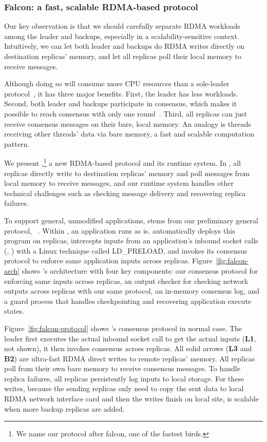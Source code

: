 \vspace{-.15in}\subsubsection{Falcon: a fast, scalable RDMA-based \paxos 
protocol} 
\label{sec:falcon}\vspace{-.075in}

Our key observation is that we should carefully separate RDMA workloads among
the leader and backups, especially in a scalability-sensitive context. 
Intuitively, we can let both leader and backups do RDMA writes directly on 
destination replicas' memory, and let all replicas poll their local memory to 
receive messages.

Although doing so will consume more CPU resources than a sole-leader 
protocol~\cite{dare:hpdc15}, it has three major benefits. First, the leader 
has less workloads. Second, both leader and backups participate in consensus, 
which makes it possible to reach consensus with only one 
round~\cite{paxos:practical}. Third, all replicas can just receive consensus 
messages on their bare, local memory. An analogy is threads receiving other 
threads' data via bare memory, a fast and scalable computation pattern.

We present \falcon,\footnote{We name our protocol after
falcon, one of the fastest birds.} a new RDMA-based \paxos protocol and its
runtime system. In \xxx, all replicas directly write to destination
replicas' memory and poll messages from local memory to receive messages, and 
our runtime system handles other technical challenges such as checking message 
delivery and recovering replica failures.

To support general, unmodified applications, \falcon stems from our preliminary 
general protocol, \crane~\cite{crane:sosp15}. Within \falcon, an application 
runs as is. \falcon automatically deploys this program on replicas, intercepts 
inputs from an application's inbound socket calls (\eg, \recv) with a Linux 
technique called LD\_PRELOAD, and invokes its consensus protocol to enforce same 
application inputs across replicas. Figure~\ref{fig:falcon-arch} shows 
\falcon's architecture with four key components: our consensus protocol for 
enforcing same inputs across replicas, an output checker for checking network 
outputs across replicas with our same protocol, an in-memory consensus 
log, and a guard process that handles checkpointing and recovering application 
execute states.

Figure~\ref{fig:falcon-protocol} shows \falcon's consensus protocol in normal 
case. The leader first executes the actual inbound socket call to get the 
actual inputs (\textbf{L1}, not shown), it then invokes consensus across 
replicas. All solid arrows (\textbf{L3} and \textbf{B2}) are ultra-fast RDMA 
direct writes to remote replicas' memory. All replicas poll from their own bare 
memory to receive consensus messages. To handle replica failures, all replicas 
persistently log inputs to local storage. For these writes, because the sending 
replicas only need to copy the sent data to local RDMA network interface card 
and then the writes finish on local site, \falcon is scalable when more backup 
replicas are added.

